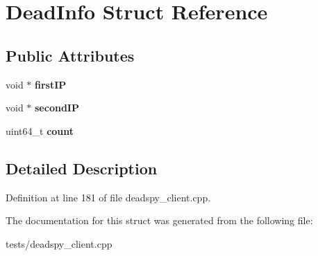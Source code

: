 \hypertarget{structDeadInfo}{\section{Dead\-Info Struct Reference}
\label{structDeadInfo}
}
\subsection*{Public Attributes}
\begin{DoxyCompactItemize}
\item 
\hypertarget{structDeadInfo_a46430150f348bcfdd3c24d0f9b08928b}{void $\ast$ {\bfseries first\-I\-P}}\label{structDeadInfo_a46430150f348bcfdd3c24d0f9b08928b}

\item 
\hypertarget{structDeadInfo_a4e7040bafef7f6ec131ff87fa882f327}{void $\ast$ {\bfseries second\-I\-P}}\label{structDeadInfo_a4e7040bafef7f6ec131ff87fa882f327}

\item 
\hypertarget{structDeadInfo_aaec4af001d31e93484e275f239a4d0c8}{uint64\-\_\-t {\bfseries count}}\label{structDeadInfo_aaec4af001d31e93484e275f239a4d0c8}

\end{DoxyCompactItemize}


\subsection{Detailed Description}


Definition at line 181 of file deadspy\-\_\-client.\-cpp.



The documentation for this struct was generated from the following file\-:\begin{DoxyCompactItemize}
\item 
tests/deadspy\-\_\-client.\-cpp\end{DoxyCompactItemize}
